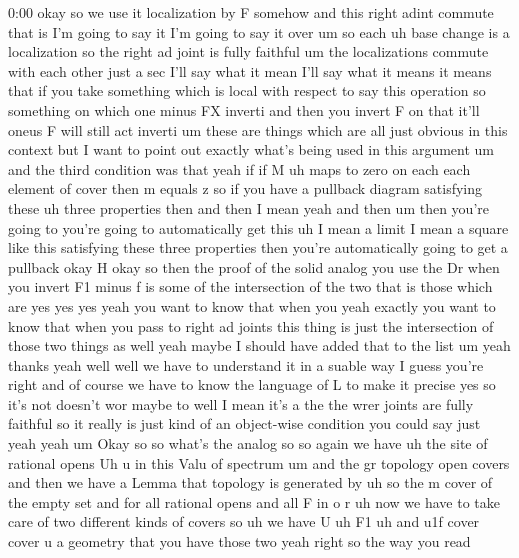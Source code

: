 \begin{unfinished}{0:00}
okay  so  we  use  it  localization  by  F
somehow  and  this  right  adint  commute
that  is  I'm  going  to  say  it  I'm  going  to
say  it
over
um  so
each  uh  base
change  is  a
localization  so  the  right  ad  joint  is
fully
faithful  um  the  localizations  commute
with  each  other
just  a  sec  I'll  say  what  it  mean  I'll
say  what  it  means  it  means  that  if  you
take  something  which  is  local  with
respect  to  say  this  operation  so
something  on  which  one  minus  FX  inverti
and  then  you  invert  F  on  that  it'll
oneus  F  will  still  act
inverti  um  these  are  things  which  are
all  just  obvious  in  this  context  but  I
want  to  point  out  exactly  what's  being
used  in  this  argument  um  and  the  third
condition  was  that  yeah  if  if  M  uh  maps
to  zero  on  each  each  element  of
cover  then  m  equals
z  so  if  you  have  a  pullback  diagram
satisfying  these  uh  three  properties
then  and  then  I  mean  yeah
and  then  um  then  you're  going  to  you're
going  to  automatically  get  this  uh  I
mean  a  limit  I  mean  a  square  like  this
satisfying  these  three  properties  then
you're  automatically  going  to  get  a
pullback
okay
H
okay  so  then  the  proof  of  the  solid
analog  you  use  the  Dr  when  you  invert  F1
minus  f  is  some  of  the  intersection  of
the  two  that  is  those  which
are  yes  yes  yes  yeah  you  want  to  know
that  when  you  yeah  exactly  you  want  to
know  that  when  you  pass  to  right  ad
joints  this  thing  is  just  the
intersection  of  those  two  things  as  well
yeah  maybe  I  should  have  added  that  to
the  list  um  yeah  thanks
yeah
well  well  we  have  to  understand  it  in  a
suable  way  I  guess  you're  right  and  of
course  we  have  to  know  the  language  of  L
to  make  it  precise  yes  so  it's  not
doesn't  wor  maybe
to  well  I  mean  it's  a  the  the  wrer
joints  are  fully  faithful  so  it  really
is  just  kind  of  an  object-wise  condition
you  could  say  just
yeah
yeah  um  Okay  so  so  what's  the  analog  so
so  again  we  have  uh  the  site  of  rational
opens  Uh  u  in  this  Valu  of
spectrum  um  and  the  gr
topology  open
covers  and  then  we  have  a
Lemma  that  topology  is  generated
by  uh  so  the  m  cover  of  the  empty
set  and  for  all  rational
opens  and  all  F  in  o
r  uh  now  we  have  to  take  care  of  two
different  kinds  of  covers  so  uh  we  have
U  uh
F1  uh  and
u1f
cover  cover  u  a  geometry  that  you  have
those  two  yeah  right  so  the  way  you  read

\end{unfinished}
